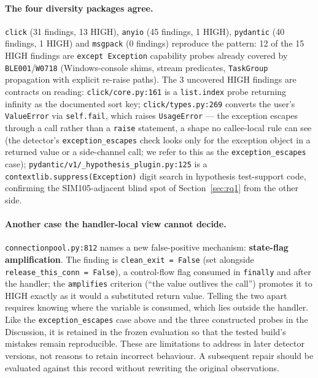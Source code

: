 \documentclass[10pt,a4paper]{article}
\begin{document}
\paragraph{The four diversity packages agree.} \texttt{click} (31 findings, 13
HIGH), \texttt{anyio} (45 findings, 1 HIGH), \texttt{pydantic} (40 findings, 1
HIGH) and \texttt{msgpack} (0 findings) reproduce the pattern: 12 of the 15 HIGH
findings are \texttt{except Exception} capability probes already covered by
\texttt{BLE001}/\texttt{W0718} (Windows-console shims, stream predicates,
\texttt{TaskGroup} propagation with explicit re-raise paths). The 3 uncovered
HIGH findings are contracts on reading: \texttt{click/core.py:161} is a
\texttt{list.index} probe returning infinity as the documented sort key;
\texttt{click/types.py:269} converts the user's \texttt{ValueError} via
\texttt{self.fail}, which raises \texttt{UsageError} --- the exception escapes
through a call rather than a \texttt{raise} statement, a shape no callee-local
rule can see (the detector's \texttt{exception\_escapes} check looks only for the
exception object in a returned value or a side-channel call; we refer to this as
the \texttt{exception\_escapes} case); \texttt{pydantic/v1/\_hypothesis\_plugin.py:125} is a
\texttt{contextlib.suppress(Exception)} digit search in hypothesis test-support
code, confirming the SIM105-adjacent blind spot of Section~\ref{sec:rq1} from the
other side.

\paragraph{Another case the handler-local view cannot decide.}
\texttt{connectionpool.py:812} names a new false-positive mechanism:
\textbf{state-flag amplification}. The finding is \texttt{clean\_exit = False} (set
alongside \texttt{release\_this\_conn = False}), a control-flow flag consumed in
\texttt{finally} and after the handler; the \texttt{amplifies} criterion (``the
value outlives the call'') promotes it to HIGH exactly as it would a substituted
return value. Telling the two apart requires knowing where the variable is
consumed, which lies outside the handler. Like the
\texttt{exception\_escapes} case above and the three constructed probes in
the Discussion, it is retained in the frozen evaluation so that the
tested build's mistakes remain reproducible. These are limitations to
address in later detector versions, not reasons to retain incorrect
behaviour. A subsequent repair should be evaluated against this record
without rewriting the original observations.
\end{document}
